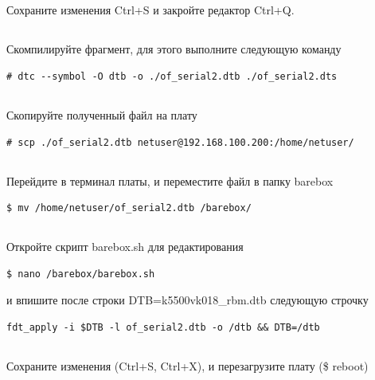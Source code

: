 \subsection{} Сохраните изменения Ctrl+S и закройте редактор Ctrl+Q. 

\subsection{ }Скомпилируйте фрагмент, для этого выполните следующую команду
\begin{lstlisting}[style=bash]
# dtc --symbol -O dtb -o ./of_serial2.dtb ./of_serial2.dts
\end{lstlisting}

\subsection{} Скопируйте полученный файл на плату
\begin{lstlisting}[style=bash]
# scp ./of_serial2.dtb netuser@192.168.100.200:/home/netuser/
\end{lstlisting}

\subsection{} Перейдите в терминал платы, и переместите файл в папку barebox
\begin{lstlisting}[style=bash]
$ mv /home/netuser/of_serial2.dtb /barebox/
\end{lstlisting}

\subsection{} Откройте скрипт barebox.sh для редактирования
\begin{lstlisting}[style=bash]
$ nano /barebox/barebox.sh
\end{lstlisting}
и впишите после строки DTB=k5500vk018\_rbm.dtb следующую строчку
\begin{lstlisting}[style=stdout]
fdt_apply -i $DTB -l of_serial2.dtb -o /dtb && DTB=/dtb
\end{lstlisting}

\subsection{} Сохраните изменения (Ctrl+S, Ctrl+X), и перезагрузите плату (\$ reboot)

